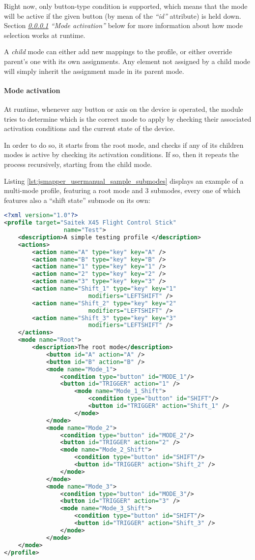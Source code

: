 Right now, only button-type condition is supported, which means that the mode will be active if the given button (by mean of the \emph{``id''} attribute) is held down. Section \emph{\ref{section:mode_activation} ``Mode activation''} below for more information about how mode selection works at runtime.

A \emph{child} mode can either add new mappings to the profile, or either override parent's one with its own assignments. Any element not assigned by a child mode will simply inherit the assignment made in its parent mode.

\paragraph{Mode activation}\label{section:mode_activation}
At runtime, whenever any button or axis on the device is operated, the module tries to determine which is the correct mode to apply by checking their associated activation conditions and the current state of the device. 

In order to do so, it starts from the root mode, and checks if any of its children modes is active by checking its activation conditions. If so, then it repeats the process recursively, starting from the child mode.

Listing \ref{lst:jsmapper_usermanual_sample_submodes} displays an example of a multi-mode profile, featuring a root mode and 3 submodes, every one of which features also a ``shift state'' submode on its own:
\begin{lstlisting}[language=XML,caption={Modes and submodes},label={lst:jsmapper_usermanual_sample_submodes}]
<?xml version="1.0"?>
<profile target="Saitek X45 Flight Control Stick" 
				 name="Test">
	<description>A simple testing profile </description>
	<actions>
		<action name="A" type="key" key="A" />
		<action name="B" type="key" key="B" />
		<action name="1" type="key" key="1" />
		<action name="2" type="key" key="2" />
		<action name="3" type="key" key="3" />
		<action name="Shift_1" type="key" key="1" 
						modifiers="LEFTSHIFT" />
		<action name="Shift_2" type="key" key="2" 
						modifiers="LEFTSHIFT" />
		<action name="Shift_3" type="key" key="3" 
						modifiers="LEFTSHIFT" />
	</actions>
	<mode name="Root">
		<description>The root mode</description>
			<button id="A" action="A" />
			<button id="B" action="B" />
			<mode name="Mode_1">
				<condition type="button" id="MODE_1"/>
				<button id="TRIGGER" action="1" />
					<mode name="Mode_1_Shift">
						<condition type="button" id="SHIFT"/>
						<button id="TRIGGER" action="Shift_1" />
					</mode>
			</mode>
			<mode name="Mode_2">
				<condition type="button" id="MODE_2"/>
				<button id="TRIGGER" action="2" />
				<mode name="Mode_2_Shift">
					<condition type="button" id="SHIFT"/>
					<button id="TRIGGER" action="Shift_2" />
				</mode>
			</mode>
			<mode name="Mode_3">
				<condition type="button" id="MODE_3"/>
				<button id="TRIGGER" action="3" />
				<mode name="Mode_3_Shift">
					<condition type="button" id="SHIFT"/>
					<button id="TRIGGER" action="Shift_3" />
				</mode>
			</mode>
	</mode>
</profile>
\end{lstlisting}


